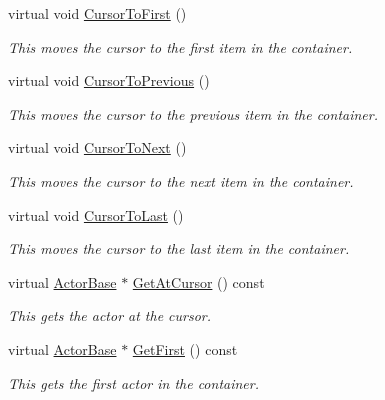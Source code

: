 \begin{DoxyCompactItemize}
virtual void \hyperlink{classphys_1_1ActorContainerVector_ad9c2eb2a9405dcf687c86745afc9c031}{CursorToFirst} ()
\begin{DoxyCompactList}\small\item\em This moves the cursor to the first item in the container. \item\end{DoxyCompactList}\item 
virtual void \hyperlink{classphys_1_1ActorContainerVector_ac483bcdf348f55dc8b04a8805a002413}{CursorToPrevious} ()
\begin{DoxyCompactList}\small\item\em This moves the cursor to the previous item in the container. \item\end{DoxyCompactList}\item 
virtual void \hyperlink{classphys_1_1ActorContainerVector_a1c72366a6261d8e98dc0a9d2fad9f70f}{CursorToNext} ()
\begin{DoxyCompactList}\small\item\em This moves the cursor to the next item in the container. \item\end{DoxyCompactList}\item 
virtual void \hyperlink{classphys_1_1ActorContainerVector_aa6b08266bbb57a22c07ab50514e58db4}{CursorToLast} ()
\begin{DoxyCompactList}\small\item\em This moves the cursor to the last item in the container. \item\end{DoxyCompactList}\item 
virtual \hyperlink{classphys_1_1ActorBase}{ActorBase} $\ast$ \hyperlink{classphys_1_1ActorContainerVector_a280700490b368a963dd8feae044c7a6d}{GetAtCursor} () const 
\begin{DoxyCompactList}\small\item\em This gets the actor at the cursor. \item\end{DoxyCompactList}\item 
virtual \hyperlink{classphys_1_1ActorBase}{ActorBase} $\ast$ \hyperlink{classphys_1_1ActorContainerVector_a55ceecd017455f3185aa62798811e3c6}{GetFirst} () const 
\begin{DoxyCompactList}\small\item\em This gets the first actor in the container. \item\end{DoxyCompactList}\item 

\end{DoxyCompactItemize}
